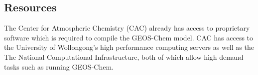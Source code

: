 \subsection{Resources}

The Center for Atmospheric Chemistry (CAC) already has access to proprietary software which is required to compile the GEOS-Chem model.
CAC has access to the University of Wollongong's high performance computing servers as well as the The National Computational Infrastructure, both of which allow high demand tasks such as running GEOS-Chem.
